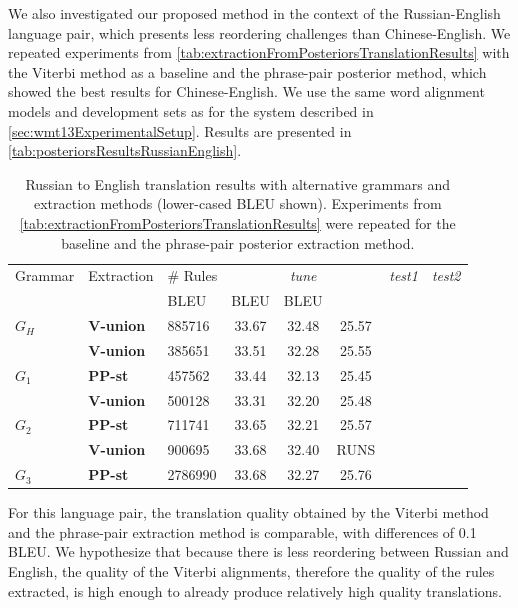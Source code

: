We also investigated our proposed method in the context of the Russian-English
language pair, which presents less reordering challenges than Chinese-English.
We repeated experiments from \autoref{tab:extractionFromPosteriorsTranslationResults}
with the Viterbi method as a baseline and the phrase-pair posterior method, which showed
the best results for Chinese-English. We use the same word alignment models and
development sets as for the system described in \autoref{sec:wmt13ExperimentalSetup}.
Results are presented in \autoref{tab:posteriorsResultsRussianEnglish}.
%
\begin{table}
  \begin{center}
    \begin{tabular}{|l|l|l||c|c|c||c||c|}
      \hline
      Grammar & Extraction & \# Rules & \multicolumn{3}{c||}{{\em tune}} & {\em test1} & {\em test2} \\  \cline{3-7}
      &            & BLEU & BLEU & BLEU \\ \hline
      $G_H$ & {\bf V-union} & 885716 & 33.67 & 32.48 & 25.57  \\
      \hline
      & {\bf V-union} & 385651 & 33.51 & 32.28 & 25.55 \\
      $G_1$ & {\bf PP-st} & 457562 & 33.44 & 32.13 & 25.45 \\
      \hline
      & {\bf V-union} & 500128 & 33.31  & 32.20 & 25.48 \\
      $G_2$& {\bf PP-st} & 711741 & 33.65 & 32.21 & 25.57 \\
      \hline
      & {\bf V-union} & 900695 & 33.68 & 32.40 & RUNS \\
      $G_3$ & {\bf PP-st} & 2786990 & 33.68 & 32.27 & 25.76 \\
      \hline
    \end{tabular}
    \caption{Russian to English translation results with alternative grammars and extraction methods (lower-cased BLEU shown). Experiments from \autoref{tab:extractionFromPosteriorsTranslationResults} were repeated for the baseline and the phrase-pair posterior extraction method. }
    \label{tab:extractionFromPosteriorsTranslationResults}
  \end{center}
\end{table}
%
For this language pair, the translation quality obtained by the Viterbi method and
the phrase-pair extraction method is comparable, with differences of 0.1 BLEU.
We hypothesize that because there is less reordering between Russian and English, the
quality of the Viterbi alignments, therefore the quality of the rules extracted, is
high enough to already produce relatively high quality translations.

